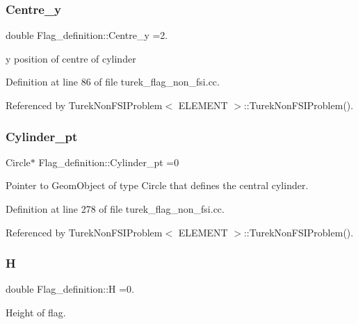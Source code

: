 \subsubsection{\texorpdfstring{Centre\+\_\+y}{Centre\_y}}
{\footnotesize\ttfamily double Flag\+\_\+definition\+::\+Centre\+\_\+y =2.}



y position of centre of cylinder 



Definition at line 86 of file turek\+\_\+flag\+\_\+non\+\_\+fsi.\+cc.



Referenced by Turek\+Non\+F\+S\+I\+Problem$<$ E\+L\+E\+M\+E\+N\+T $>$\+::\+Turek\+Non\+F\+S\+I\+Problem().

\mbox{\label{namespaceFlag__definition_a87051411606f6aa4518ace9ce66a4189}} 
\subsubsection{\texorpdfstring{Cylinder\+\_\+pt}{Cylinder\_pt}}
{\footnotesize\ttfamily Circle$\ast$ Flag\+\_\+definition\+::\+Cylinder\+\_\+pt =0}



Pointer to Geom\+Object of type Circle that defines the central cylinder. 



Definition at line 278 of file turek\+\_\+flag\+\_\+non\+\_\+fsi.\+cc.



Referenced by Turek\+Non\+F\+S\+I\+Problem$<$ E\+L\+E\+M\+E\+N\+T $>$\+::\+Turek\+Non\+F\+S\+I\+Problem().

\mbox{\label{namespaceFlag__definition_a6cdf33de1fe6f94832181664d7769af7}} 
\subsubsection{\texorpdfstring{H}{H}}
{\footnotesize\ttfamily double Flag\+\_\+definition\+::H =0.}



Height of flag. 



